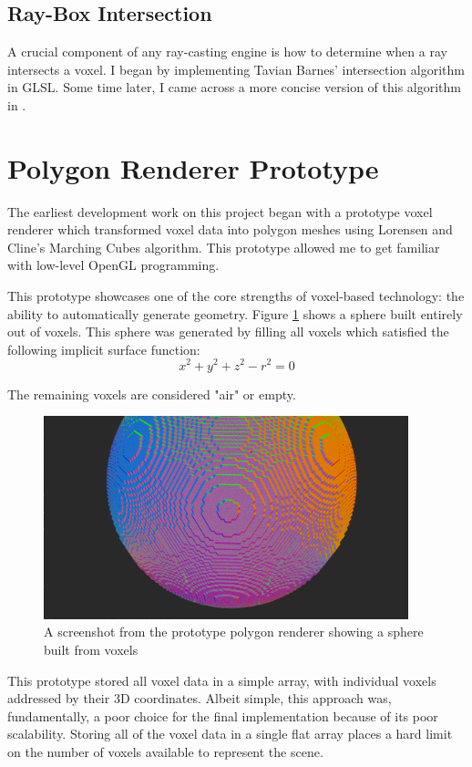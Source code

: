 \subsection{Ray-Box Intersection}
A crucial component of any ray-casting engine is how to determine when a ray intersects a voxel. I began by implementing Tavian Barnes' intersection algorithm\autocite{barnes2011} in GLSL. Some time later, I came across a more concise version of this algorithm in \autocite{majercik2018ray}.

\section{Polygon Renderer Prototype}
The earliest development work on this project began with a prototype voxel renderer which transformed voxel data into polygon meshes using Lorensen and Cline's Marching Cubes algorithm. This prototype allowed me to get familiar with low-level OpenGL programming.

This prototype showcases one of the core strengths of voxel-based technology: the ability to automatically generate geometry. Figure \ref{fig:polygon_renderer_sphere} shows a sphere built entirely out of voxels. This sphere was generated by filling all voxels which satisfied the following implicit surface function:
$$
x^2 + y^2 + z^2 - r^2 = 0
$$

The remaining voxels are considered "air" or empty.


\begin{figure}[ht]
    \centering
    \includegraphics[width=400px]{graphics/prototype_sphere.png}
    \caption{A screenshot from the prototype polygon renderer showing a sphere built from voxels}
    \label{fig:polygon_renderer_sphere}
\end{figure}

This prototype stored all voxel data in a simple array, with individual voxels addressed by their 3D coordinates. Albeit simple, this approach was, fundamentally, a poor choice for the final implementation because of its poor scalability. Storing all of the voxel data in a single flat array places a hard limit on the number of voxels available to represent the scene.
